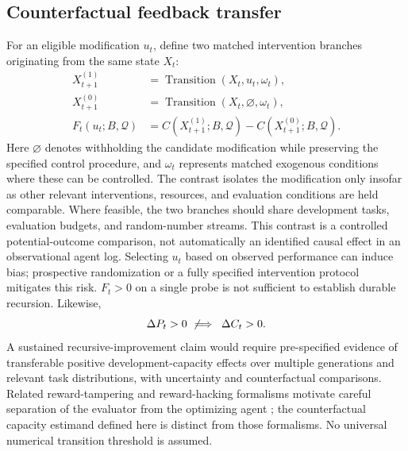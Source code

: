\documentclass[11pt,a4paper]{article}
\begin{document}
\subsection{Counterfactual feedback transfer}
For an eligible modification $u_t$, define two matched intervention branches originating from the same state $X_t$:
\begin{align}
X_{t+1}^{(1)}
&=\operatorname{Transition}(X_t,u_t,\omega_t),\\
X_{t+1}^{(0)}
&=\operatorname{Transition}(X_t,\varnothing,\omega_t),\\
F_t(u_t;B,\mathcal{Q})
&=C(X_{t+1}^{(1)};B,\mathcal{Q})
-C(X_{t+1}^{(0)};B,\mathcal{Q}).
\label{eq:feedback}
\end{align}
Here $\varnothing$ denotes withholding the candidate modification while preserving the specified control
procedure, and $\omega_t$ represents matched exogenous conditions where these can be controlled.
The contrast isolates the modification only insofar as other relevant interventions, resources, and
evaluation conditions are held comparable.
Where feasible, the two branches should share development tasks, evaluation budgets, and random-number streams. This contrast is a controlled potential-outcome comparison, not automatically an identified causal effect in an observational agent log. Selecting $u_t$ based on observed performance can induce bias; prospective randomization or a fully specified intervention protocol mitigates this risk. $F_t>0$ on a single probe is not sufficient to establish durable recursion. Likewise,
\begin{equation}
\Delta P_t>0\;\not\!\implies\;\Delta C_t>0.
\end{equation}
A sustained recursive-improvement claim would require pre-specified evidence of transferable positive development-capacity effects over multiple generations and relevant task distributions, with uncertainty and counterfactual comparisons. Related reward-tampering and reward-hacking formalisms motivate careful separation of the evaluator from the optimizing agent \cite{everitt2021,skalse2022}; the counterfactual capacity estimand defined here is distinct from those formalisms. No universal numerical transition threshold is assumed.
\end{document}

